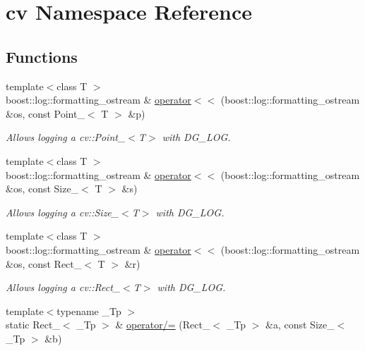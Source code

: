 \hypertarget{namespacecv}{}\section{cv Namespace Reference}
\label{namespacecv}
\subsection*{Functions}
\begin{DoxyCompactItemize}
\item 
{\footnotesize template$<$class T $>$ }\\boost\+::log\+::formatting\+\_\+ostream \& \hyperlink{group___imagery_module_ga4d7a2828ed1d678a96fa0ad0591c4103}{operator$<$$<$} (boost\+::log\+::formatting\+\_\+ostream \&os, const Point\+\_\+$<$ T $>$ \&p)
\begin{DoxyCompactList}\small\item\em Allows logging a cv\+::\+Point\+\_\+$<$\+T$>$ with D\+G\+\_\+\+L\+OG. \end{DoxyCompactList}\item 
{\footnotesize template$<$class T $>$ }\\boost\+::log\+::formatting\+\_\+ostream \& \hyperlink{group___imagery_module_ga0656a5315cde33b97aa201d95d1a285f}{operator$<$$<$} (boost\+::log\+::formatting\+\_\+ostream \&os, const Size\+\_\+$<$ T $>$ \&s)
\begin{DoxyCompactList}\small\item\em Allows logging a cv\+::\+Size\+\_\+$<$\+T$>$ with D\+G\+\_\+\+L\+OG. \end{DoxyCompactList}\item 
{\footnotesize template$<$class T $>$ }\\boost\+::log\+::formatting\+\_\+ostream \& \hyperlink{group___imagery_module_gae1a3630bfbc5f81997647209bc6fcc38}{operator$<$$<$} (boost\+::log\+::formatting\+\_\+ostream \&os, const Rect\+\_\+$<$ T $>$ \&r)
\begin{DoxyCompactList}\small\item\em Allows logging a cv\+::\+Rect\+\_\+$<$\+T$>$ with D\+G\+\_\+\+L\+OG. \end{DoxyCompactList}\item 
{\footnotesize template$<$typename \+\_\+\+Tp $>$ }\\static Rect\+\_\+$<$ \+\_\+\+Tp $>$ \& \hyperlink{namespacecv_a29f4aabf7a99f6fc476b84aff7661fb3}{operator/=} (Rect\+\_\+$<$ \+\_\+\+Tp $>$ \&a, const Size\+\_\+$<$ \+\_\+\+Tp $>$ \&b)
\item 

\end{DoxyCompactItemize}
